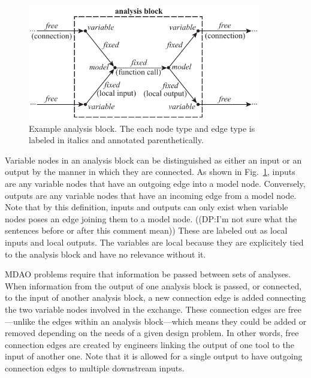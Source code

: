 \begin{figure}[htb!]
    \begin{center}
    \includegraphics[width=4in]{images/analysis_block}
    \end{center}
    \vspace{-10pt}
\caption{Example analysis block. The each node type and edge type is labeled in italics and annotated parenthetically.}
\label{f:analysis block}
\end{figure}

Variable nodes in an analysis block can be distinguished as either an input or an output by the manner in which they are connected. As shown in Fig.~\ref{f:analysis block}, inputs are any variable nodes that have an outgoing edge into a model 
node. Conversely, outputs are any variable nodes that have an incoming edge from a model node. 
Note that by this definition, inputs and outputs can only exist when variable nodes poses an 
edge joining them to a model node. 
((DP:I'm not sure what the sentences before or after this comment mean))
These are labeled out as 
local inputs and local outputs. The variables are local because they are explicitely tied
to the analysis block and have no relevance without it. 

MDAO problems require that information be passed between sets of analyses. When 
information from the output of one analysis block is passed, or connected, to the 
input of another analysis block, a new connection edge is added connecting the two 
variable nodes involved in the exchange. These connection edges are free---unlike the edges 
within an analysis block---which means they could be added or removed depending on the needs
of a given design problem. In other words, free connection edges are created by 
engineers linking the output of one tool to the input of another one. Note that 
it is allowed for a single output to have outgoing connection edges to multiple 
downstream inputs. 

